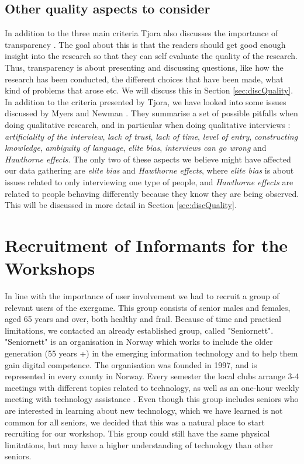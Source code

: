 \subsection{Other quality aspects to consider}
\label{sec:otherQualityAspects}
In addition to the three main criteria Tjora also discusses the importance of transparency \cite{tjora}. The goal about this is that the readers should get good enough insight into the research so that they can self evaluate the quality of the research. Thus, transparency is about presenting and discussing questions, like how the research has been conducted, the different choices that have been made, what kind of problems that arose etc. We will discuss this in Section \ref{sec:discQuality}. In addition to the criteria presented by Tjora, we have looked into some issues discussed by Myers and Newman \cite{interview}. They summarise a set of possible pitfalls when doing qualitative research, and in particular when doing qualitative interviews \cite{interview}: \emph{artificiality of the interview}, \emph{lack of trust}, \emph{lack of time}, \emph{level of entry}, \emph{constructing knowledge}, \emph{ambiguity of language}, \emph{elite bias}, \emph{interviews can go wrong} and \emph{Hawthorne effects}. The only two of these aspects we believe might have affected our data gathering are \emph{elite bias} and \emph{Hawthorne effects}, where \emph{elite bias} is about issues related to only interviewing one type of people, and \emph{Hawthorne effects} are related to people behaving differently because they know they are being observed. This will be discussed in more detail in Section \ref{sec:discQuality}.

\section{Recruitment of Informants for the Workshops}
\label{sec:recruitment}
In line with the importance of user involvement we had to recruit a group of relevant users of the exergame. This group consists of senior males and females, aged 65 years and over, both healthy and frail. Because of time and practical limitations, we contacted an already established group, called "Seniornett". "Seniornett" is an organisation in Norway which works to include the older generation (55 years +) in the emerging information technology and to help them gain digital competence. The organisation was founded in 1997, and is represented in every county in Norway. Every semester the local clubs arrange 3-4 meetings with different topics related to technology, as well as an one-hour weekly meeting with technology assistance \cite{seniornett}. Even though this group includes seniors who are interested in learning about new technology, which we have learned is not common for all seniors, we decided that this was a natural place to start recruiting for our workshop. This group could still have the same physical limitations, but may have a higher understanding of technology than other seniors. 


